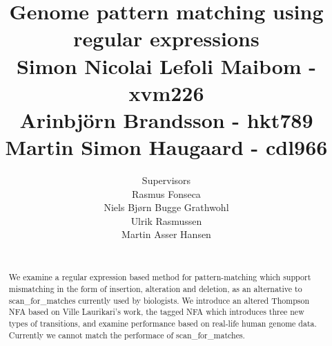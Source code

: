 \documentclass{article}
\author{
\huge{Supervisors}\\
\Large{Rasmus Fonseca}\\
\Large{Niels Bjørn Bugge Grathwohl}\\
\Large{Ulrik Rasmussen}\\
\Large{Martin Asser Hansen}\\
    \\ \texttt{}
}
\title{
  \vspace{3cm}
  \Huge{Genome pattern matching using regular expressions} \\
  \Large{Simon Nicolai Lefoli Maibom - xvm226} \\
  \Large{Arinbjörn Brandsson - hkt789}\\
  \Large{Martin Simon Haugaard - cdl966}
}
\begin{document}


\clearpage\maketitle
\thispagestyle{empty}

\newpage
\begin{abstract}
We examine a regular expression based method for pattern-matching which support mismatching in the form of insertion, alteration and deletion, as an alternative to scan\_for\_matches currently used by biologists. We introduce an altered Thompson NFA based on Ville Laurikari's work, the tagged NFA which introduces three new types of transitions, and examine performance based on real-life human genome data. Currently we cannot match the performace of scan\_for\_matches.
\end{abstract}
\newpage
\tableofcontents
 
\newpage


















\end{document}
